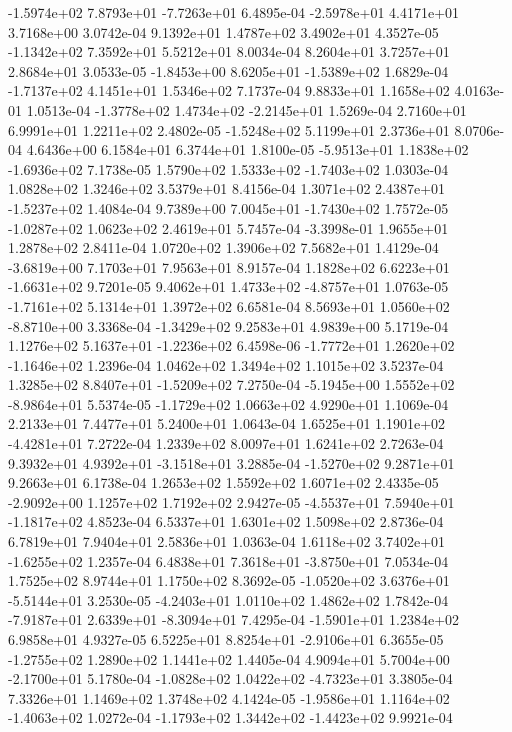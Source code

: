 -1.5974e+02  7.8793e+01 -7.7263e+01  6.4895e-04
-2.5978e+01  4.4171e+01  3.7168e+00  3.0742e-04
9.1392e+01 1.4787e+02 3.4902e+01  4.3527e-05
-1.1342e+02  7.3592e+01  5.5212e+01  8.0034e-04
8.2604e+01 3.7257e+01 2.8684e+01  3.0533e-05
-1.8453e+00  8.6205e+01 -1.5389e+02  1.6829e-04
-1.7137e+02  4.1451e+01  1.5346e+02  7.1737e-04
9.8833e+01 1.1658e+02 4.0163e-01  1.0513e-04
-1.3778e+02  1.4734e+02 -2.2145e+01  1.5269e-04
2.7160e+01 6.9991e+01 1.2211e+02  2.4802e-05
-1.5248e+02  5.1199e+01  2.3736e+01  8.0706e-04
4.6436e+00 6.1584e+01 6.3744e+01  1.8100e-05
-5.9513e+01  1.1838e+02 -1.6936e+02  7.1738e-05
 1.5790e+02  1.5333e+02 -1.7403e+02  1.0303e-04
1.0828e+02 1.3246e+02 3.5379e+01  8.4156e-04
 1.3071e+02  2.4387e+01 -1.5237e+02  1.4084e-04
 9.7389e+00  7.0045e+01 -1.7430e+02  1.7572e-05
-1.0287e+02  1.0623e+02  2.4619e+01  5.7457e-04
-3.3998e-01  1.9655e+01  1.2878e+02  2.8411e-04
1.0720e+02 1.3906e+02 7.5682e+01  1.4129e-04
-3.6819e+00  7.1703e+01  7.9563e+01  8.9157e-04
 1.1828e+02  6.6223e+01 -1.6631e+02  9.7201e-05
 9.4062e+01  1.4733e+02 -4.8757e+01  1.0763e-05
-1.7161e+02  5.1314e+01  1.3972e+02  6.6581e-04
 8.5693e+01  1.0560e+02 -8.8710e+00  3.3368e-04
-1.3429e+02  9.2583e+01  4.9839e+00  5.1719e-04
 1.1276e+02  5.1637e+01 -1.2236e+02  6.4598e-06
-1.7772e+01  1.2620e+02 -1.1646e+02  1.2396e-04
1.0462e+02 1.3494e+02 1.1015e+02  3.5237e-04
 1.3285e+02  8.8407e+01 -1.5209e+02  7.2750e-04
-5.1945e+00  1.5552e+02 -8.9864e+01  5.5374e-05
-1.1729e+02  1.0663e+02  4.9290e+01  1.1069e-04
2.2133e+01 7.4477e+01 5.2400e+01  1.0643e-04
 1.6525e+01  1.1901e+02 -4.4281e+01  7.2722e-04
1.2339e+02 8.0097e+01 1.6241e+02  2.7263e-04
 9.3932e+01  4.9392e+01 -3.1518e+01  3.2885e-04
-1.5270e+02  9.2871e+01  9.2663e+01  6.1738e-04
1.2653e+02 1.5592e+02 1.6071e+02  2.4335e-05
-2.9092e+00  1.1257e+02  1.7192e+02  2.9427e-05
-4.5537e+01  7.5940e+01 -1.1817e+02  4.8523e-04
6.5337e+01 1.6301e+02 1.5098e+02  2.8736e-04
6.7819e+01 7.9404e+01 2.5836e+01  1.0363e-04
 1.6118e+02  3.7402e+01 -1.6255e+02  1.2357e-04
 6.4838e+01  7.3618e+01 -3.8750e+01  7.0534e-04
1.7525e+02 8.9744e+01 1.1750e+02  8.3692e-05
-1.0520e+02  3.6376e+01 -5.5144e+01  3.2530e-05
-4.2403e+01  1.0110e+02  1.4862e+02  1.7842e-04
-7.9187e+01  2.6339e+01 -8.3094e+01  7.4295e-04
-1.5901e+01  1.2384e+02  6.9858e+01  4.9327e-05
 6.5225e+01  8.8254e+01 -2.9106e+01  6.3655e-05
-1.2755e+02  1.2890e+02  1.1441e+02  1.4405e-04
 4.9094e+01  5.7004e+00 -2.1700e+01  5.1780e-04
-1.0828e+02  1.0422e+02 -4.7323e+01  3.3805e-04
7.3326e+01 1.1469e+02 1.3748e+02  4.1424e-05
-1.9586e+01  1.1164e+02 -1.4063e+02  1.0272e-04
-1.1793e+02  1.3442e+02 -1.4423e+02  9.9921e-04
